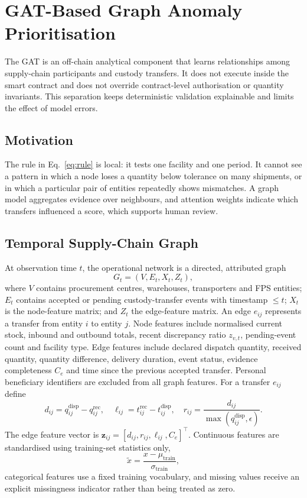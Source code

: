 \documentclass[conference,a4paper]{IEEEtran}
\newcommand{\qdisp}{q^{\mathrm{disp}}}
\newcommand{\qrec}{q^{\mathrm{rec}}}
\begin{document}
\section{GAT-Based Graph Anomaly Prioritisation}
\label{sec:gat}
The GAT is an off-chain analytical component that learns relationships among supply-chain participants and custody transfers. It does not execute inside the smart contract and does not override contract-level authorisation or quantity invariants. This separation keeps deterministic validation explainable and limits the effect of model errors.

\subsection{Motivation}
The rule in Eq.~\eqref{eq:rule} is local: it tests one facility and one period. It cannot see a pattern in which a node loses a quantity below tolerance on many shipments, or in which a particular pair of entities repeatedly shows mismatches. A graph model aggregates evidence over neighbours, and attention weights indicate which transfers influenced a score, which supports human review.

\subsection{Temporal Supply-Chain Graph}
At observation time $t$, the operational network is a directed, attributed graph
\begin{equation}
G_t=(V,E_t,X_t,Z_t),
\label{eq:graph}
\end{equation}
where $V$ contains procurement centres, warehouses, transporters and FPS entities; $E_t$ contains accepted or pending custody-transfer events with timestamp $\le t$; $X_t$ is the node-feature matrix; and $Z_t$ the edge-feature matrix. An edge $e_{ij}$ represents a transfer from entity $i$ to entity $j$. Node features include normalised current stock, inbound and outbound totals, recent discrepancy ratio $z_{v,t}$, pending-event count and facility type. Edge features include declared dispatch quantity, received quantity, quantity difference, delivery duration, event status, evidence completeness $C_e$ and time since the previous accepted transfer. Personal beneficiary identifiers are excluded from all graph features. For a transfer $e_{ij}$ define
\begin{equation}
d_{ij}=\qdisp_{ij}-\qrec_{ij},\quad \ell_{ij}=t^{\mathrm{rec}}_{ij}-t^{\mathrm{disp}}_{ij},\quad r_{ij}=\frac{d_{ij}}{\max(\qdisp_{ij},\epsilon)}.
\label{eq:edgefeat}
\end{equation}
The edge feature vector is $\mathbf z_{ij}=[d_{ij},r_{ij},\ell_{ij},C_e]^{\top}$. Continuous features are standardised using training-set statistics only,
\begin{equation}
\tilde x=\frac{x-\mu_{\mathrm{train}}}{\sigma_{\mathrm{train}}},
\label{eq:std}
\end{equation}
categorical features use a fixed training vocabulary, and missing values receive an explicit missingness indicator rather than being treated as zero.
\end{document}
